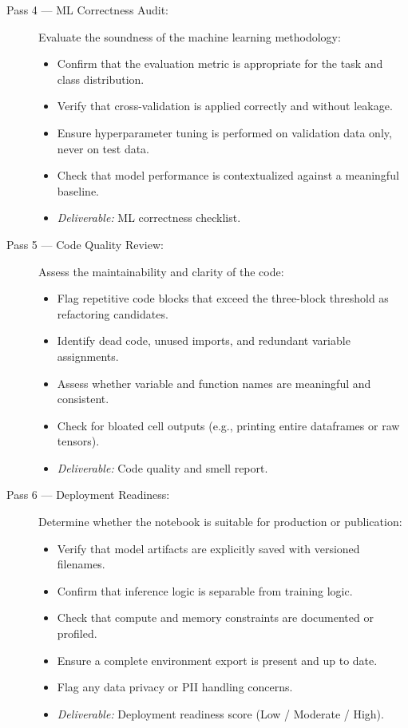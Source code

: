 \documentclass[11pt, a4paper]{article}
\begin{document}
\begin{description}
	\item[Pass 4 — ML Correctness Audit:]
	Evaluate the soundness of the machine learning methodology:
	\begin{itemize}
		\item Confirm that the evaluation metric is appropriate
		for the task and class distribution.
		\item Verify that cross-validation is applied correctly
		and without leakage.
		\item Ensure hyperparameter tuning is performed on
		validation data only, never on test data.
		\item Check that model performance is contextualized
		against a meaningful baseline.
		\item \textit{Deliverable:} ML correctness checklist.
	\end{itemize}
	
	\item[Pass 5 — Code Quality Review:]
	Assess the maintainability and clarity of the code:
	\begin{itemize}
		\item Flag repetitive code blocks that exceed the
		three-block threshold as refactoring candidates.
		\item Identify dead code, unused imports, and
		redundant variable assignments.
		\item Assess whether variable and function names
		are meaningful and consistent.
		\item Check for bloated cell outputs
		(e.g., printing entire dataframes or raw tensors).
		\item \textit{Deliverable:} Code quality and smell report.
	\end{itemize}
	
	\item[Pass 6 — Deployment Readiness:]
	Determine whether the notebook is suitable for production or
	publication:
	\begin{itemize}
		\item Verify that model artifacts are explicitly saved
		with versioned filenames.
		\item Confirm that inference logic is separable from
		training logic.
		\item Check that compute and memory constraints are
		documented or profiled.
		\item Ensure a complete environment export is present
		and up to date.
		\item Flag any data privacy or PII handling concerns.
		\item \textit{Deliverable:} Deployment readiness score
		(Low / Moderate / High).
	\end{itemize}
	
\end{description}
\end{document}
